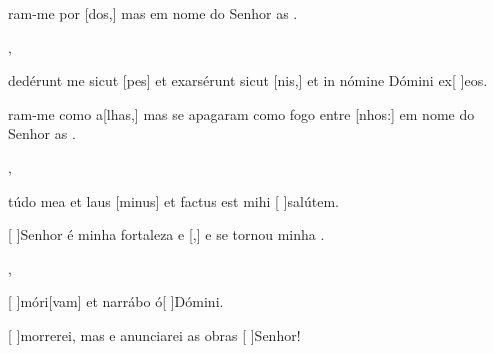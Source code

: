 {    {\item {}ram-me por [dos,] mas em nome do Senhor as .~\Antiphona},
  {\item {}dedérunt me sicut [pes] et exarsérunt sicut [nis,] et in nómine Dómini ex[ ]{e}os.~\Antiphona}%
    {\item {}ram-me como a[lhas,] mas se apagaram co\-mo fogo entre [nhos:] em nome do Senhor as .~\Antiphona},
  {\item {}túdo mea et laus [minus] et factus est mihi [ ]{sa}{lú}tem.~\Antiphona}%
    {\item {}[ ]{Se}nhor é minha fortaleza e [,] e se tornou minha .~\Antiphona},
  {\item {}[ ]{mó}ri[vam] et narrábo ó[ ]{Dó}mini.~\Antiphona}%
    {\item {}[ ]{mor}rerei, mas  e anunciarei as obras [ ]{Se}{\-nhor}!~\Antiphona}
}